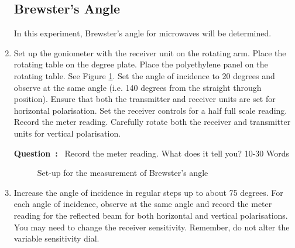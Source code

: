\documentclass{article}
\newcounter{question}
\newcommand{\Question}{\textbf{Question~\thequestion:}~ \stepcounter{question}}
\begin{document}
\begin{enumerate}
\subsection*{Brewster's Angle}

In this experiment, Brewster's angle for microwaves will be determined. 

\item Set up the goniometer with the receiver unit on the rotating arm. Place the rotating table on the degree plate. Place the polyethylene
panel on the rotating table. See Figure \ref{fig:brewster}. Set the angle of incidence to 20 degrees and observe at the same angle  (i.e.
140 degrees from the straight through position). Ensure that both the transmitter and receiver units are set for horizontal polarisation.
Set the receiver controls for a half full scale reading. Record the meter reading. Carefully rotate both the receiver and transmitter units
for vertical polarisation. 

\Question Record the meter reading. What does it tell you? 10-30 Words

\begin{figure}[!h]
\begin{centering}

\caption{\label{fig:brewster}Set-up for the measurement of Brewster's angle}
\end{centering}
\end{figure}

\item Increase the angle of incidence in regular steps up to about 75 degrees. For each angle of incidence, observe at the same angle and
record the meter reading for the reflected beam for both horizontal and vertical polarisations. You may need to change the receiver
sensitivity. Remember, do not alter the variable sensitivity dial.


\end{enumerate}
\end{document}

